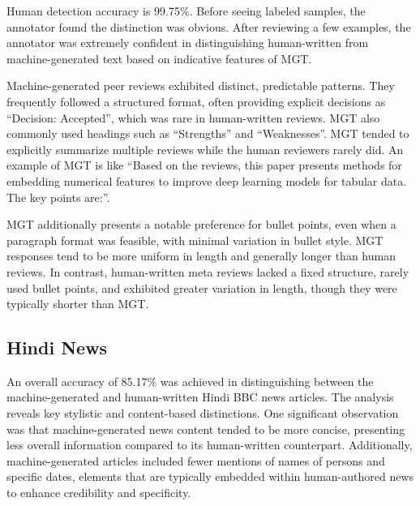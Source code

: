 

Human detection accuracy is 99.75\%.
Before seeing labeled samples, the annotator found the distinction was obvious. After reviewing a few examples, the annotator was extremely confident in distinguishing human-written from machine-generated text based on indicative features of MGT. 

Machine-generated peer reviews exhibited distinct, predictable patterns. They frequently followed a structured format, often providing explicit decisions as ``Decision: Accepted'', which was rare in human-written reviews. MGT also commonly used headings such as ``Strengths'' and ``Weaknesses''. MGT tended to explicitly summarize multiple reviews while the human reviewers rarely did. An example of MGT is like ``Based on the reviews, this paper presents methods for embedding numerical features to improve deep learning models for tabular data. The key points are:''.

MGT additionally presents a notable preference for bullet points, even when a paragraph format was feasible, with minimal variation in bullet style. MGT responses tend to be more uniform in length and generally longer than human reviews. In contrast, human-written meta reviews lacked a fixed structure, rarely used bullet points, and exhibited greater variation in length, though they were typically shorter than MGT.




\subsection{Hindi News}
An overall accuracy of 85.17\% was achieved in distinguishing between the machine-generated and human-written Hindi BBC news articles.
The analysis reveals key stylistic and content-based distinctions.
One significant observation was that machine-generated news content tended to be more concise, presenting less overall information compared to its human-written counterpart. Additionally, machine-generated articles included fewer mentions of names of persons and specific dates, elements that are typically embedded within human-authored news to enhance credibility and specificity.

